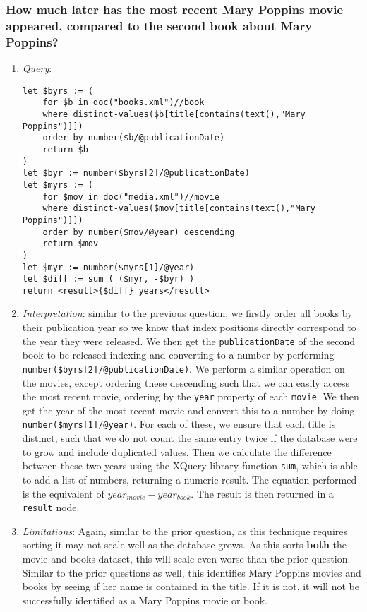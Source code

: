 \documentclass[11pt]{article}
\begin{document}
\subsubsection{How much later has the most recent Mary Poppins movie appeared, compared to the second book about Mary Poppins?}

\begin{enumerate}
\item \textit{Query}:
\begin{small}
\begin{verbatim}
let $byrs := ( 
    for $b in doc("books.xml")//book 
    where distinct-values($b[title[contains(text(),"Mary Poppins")]])
    order by number($b/@publicationDate) 
    return $b 
) 
let $byr := number($byrs[2]/@publicationDate) 
let $myrs := ( 
    for $mov in doc("media.xml")//movie 
    where distinct-values($mov[title[contains(text(),"Mary Poppins")]])
    order by number($mov/@year) descending 
    return $mov 
) 
let $myr := number($myrs[1]/@year) 
let $diff := sum ( ($myr, -$byr) ) 
return <result>{$diff} years</result>
\end{verbatim}
\end{small}
\item \textit{Interpretation}: similar to the previous question, we firstly order all books by their publication year so we know that index positions directly correspond to the year they were released. We then get the \texttt{publicationDate} of the second book to be released indexing and converting to a number by performing \texttt{number(\$byrs[2]/@publicationDate)}. We perform a similar operation on the movies, except ordering these descending such that we can easily access the most recent movie, ordering by the \texttt{year} property of each \texttt{movie}. We then get the year of the most recent movie and convert this to a number by doing \texttt{number(\$myrs[1]/@year)}. For each of these, we ensure that each title is distinct, such that we do not count the same entry twice if the database were to grow and include duplicated values. Then we calculate the difference between these two years using the XQuery library function \texttt{sum}, which is able to add a list of numbers, returning a numeric result. The equation performed is the equivalent of $year_{movie}-year_{book}$. The result is then returned in a \texttt{result} node.
\item \textit{Limitations}: Again, similar to the prior question, as this technique requires sorting it may not scale well as the database grows. As this sorts \textbf{both} the movie and books dataset, this will scale even worse than the prior question. Similar to the prior questions as well, this identifies Mary Poppins movies and books by seeing if her name is contained in the title. If it is not, it will not be successfully identified as a Mary Poppins movie or book.

\end{enumerate}
\end{document}
